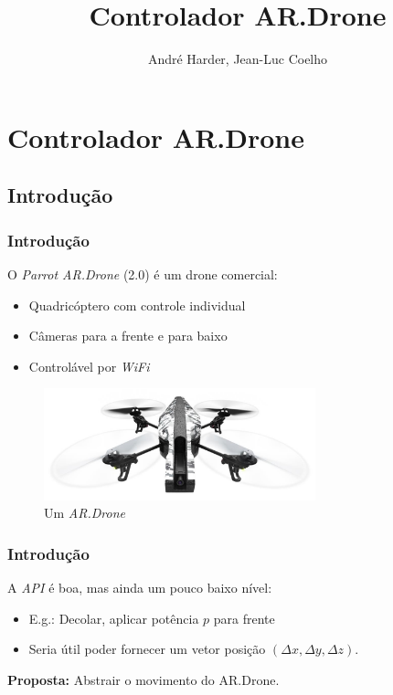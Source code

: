 \documentclass[]{beamer}
\title{Controlador AR.Drone}
\author{André Harder, Jean-Luc Coelho}
\institute{Departamento de Ciência da Computação, UFMG}
\date{}                    %
\begin{document}
\begin{frame}
  \titlepage
\end{frame}

\section{Controlador AR.Drone}
\subsection{Introdução}

\begin{frame}
\frametitle{Introdução}

O \emph{Parrot AR.Drone} (2.0) é um drone comercial:
\begin{itemize}
\item Quadricóptero com controle individual
\item Câmeras para a frente e para baixo
\item Controlável por \emph{WiFi}
\end{itemize}

\begin{figure}
	\centering
	\includegraphics[width=0.7\textwidth]{images/ARDrone.jpg}
	\caption{Um \emph{AR.Drone}}
	\label{figARDrone}
\end{figure}
\end{frame}

\begin{frame}
\frametitle{Introdução}

A \emph{API} é boa, mas ainda um pouco baixo nível: 
\begin{itemize}
\item E.g.: Decolar, aplicar potência $p$ para frente
\item Seria útil poder fornecer um vetor posição $(\Delta x, \Delta y, \Delta z)$.
\end{itemize}

\vspace{2.5ex}

\textbf{Proposta:} Abstrair o movimento do AR.Drone. 

\end{frame}
\end{document}
